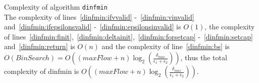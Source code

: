 \begin{sepproof}{Complexity of algorithm \texttt{dinfmin}} \ \\
  The complexity of lines~\ref{dinfmin:ifvvalid} -~\ref{dinfmin:vinvalid} and~\ref{dinfmin:ifepsilonsvalid}
  -~\ref{dinfmin:epsilonsinvalid} is $O\left(1\right)$, the complexity of
  lines~\ref{dinfmin:finit},~\ref{dinfmin:deltainit},~\ref{dinfmin:forsetcap} -~\ref{dinfmin:setcap} and~\ref{dinfmin:return}
  is $O\left(n\right)$ and the complexity of line~\ref{dinfmin:bs} is $O\left(BinSearch\right) = O\left(\left(maxFlow +
  n\right) \log_2\left(\frac{\delta_{max}}{\epsilon_1 + \epsilon_2}\right)\right)$, thus the total complexity of dinfmin is
  $O\left(\left(maxFlow + n\right)\log_2\left(\frac{\delta_{max}}{\epsilon_1 + \epsilon_2}\right)\right)$.
\end{sepproof}
